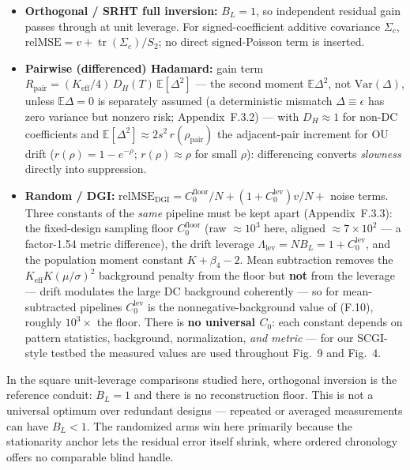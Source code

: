 \begin{itemize}[leftmargin=*,itemsep=1pt,topsep=2pt]
\item \textbf{Orthogonal / SRHT full inversion:} $B_L=1$, so independent residual gain passes through at unit leverage. For signed-coefficient additive covariance $\Sigma_c$, $\mathrm{relMSE}=v+\operatorname{tr}(\Sigma_c)/S_2$; no direct signed-Poisson term is inserted.
\item \textbf{Pairwise (differenced) Hadamard:} gain term $R_{\mathrm{pair}} = (K_{\mathrm{eff}}/4)\,D_H(T)\,\mathbb{E}[\Delta^2]$ --- the second moment $\mathbb{E}\Delta^2$, not $\mathrm{Var}(\Delta)$, unless $\mathbb{E}\Delta=0$ is separately assumed (a deterministic mismatch $\Delta\equiv\epsilon$ has zero variance but nonzero risk; Appendix~F.3.2) --- with $D_H\approx 1$ for non-DC coefficients and $\mathbb{E}[\Delta^2]\approx 2s^2\,r(\rho_{\mathrm{pair}})$ the adjacent-pair increment for OU drift ($r(\rho)=1-e^{-\rho}$; $r(\rho)\approx\rho$ for small $\rho$): differencing converts \emph{slowness} directly into suppression.
\item \textbf{Random / DGI:} $\mathrm{relMSE}_{\mathrm{DGI}} = C_0^{\mathrm{floor}}/N + (1+C_0^{\mathrm{lev}})v/N + $ noise terms. Three constants of the \emph{same} pipeline must be kept apart (Appendix~F.3.3): the fixed-design sampling floor $C_0^{\mathrm{floor}}$ (raw $\approx10^3$ here, aligned $\approx7\times10^2$ --- a factor-1.54 metric difference), the drift leverage $\Lambda_{\mathrm{lev}}=NB_L=1+C_0^{\mathrm{lev}}$, and the population moment constant $K+\beta_4-2$. Mean subtraction removes the $K_{\mathrm{eff}}K(\mu/\sigma)^2$ background penalty from the floor but \textbf{not} from the leverage --- drift modulates the large DC background coherently --- so for mean-subtracted pipelines $C_0^{\mathrm{lev}}$ is the nonnegative-background value of (F.10), roughly $10^3\times$ the floor. There is \textbf{no universal $C_0$}: each constant depends on pattern statistics, background, normalization, \emph{and metric} --- for our SCGI-style testbed \cite{PengChen2024APL} the measured values are used throughout Fig.~9 and Fig.~4.
\end{itemize}

In the square unit-leverage comparisons studied here, orthogonal inversion is the reference conduit: $B_L=1$ and there is no reconstruction floor. This is not a universal optimum over redundant designs --- repeated or averaged measurements can have $B_L<1$. The randomized arms win here primarily because the stationarity anchor lets the residual error itself shrink, where ordered chronology offers no comparable blind handle.

